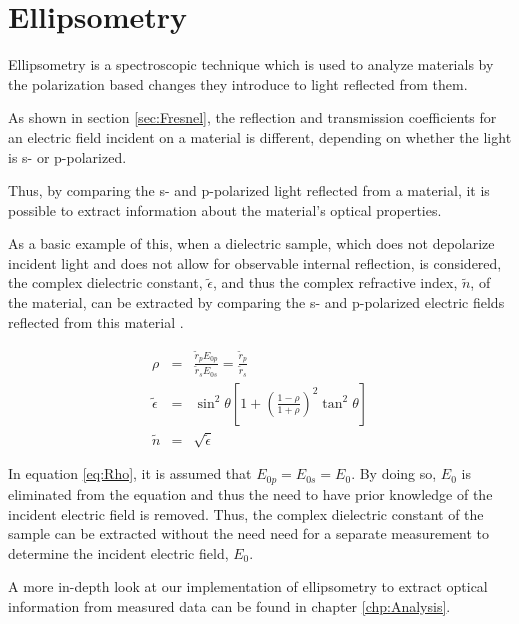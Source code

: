 \section{Ellipsometry}
\label{sec:Ellip}

Ellipsometry is a spectroscopic technique which is used to analyze materials by the polarization based changes they introduce to light reflected from them.

As shown in section \ref{sec:Fresnel}, the reflection and transmission coefficients for an electric field incident on a material is different, depending on whether the light is s- or p-polarized.

Thus, by comparing the s- and p-polarized light reflected from a material, it is possible to extract information about the material's optical properties.

As a basic example of this, when a dielectric sample, which does not depolarize incident light and does not allow for observable internal reflection, is considered, the complex dielectric constant, $\widetilde{\epsilon}$, and thus the complex refractive index, $\widetilde{n}$, of the material, can be extracted by comparing the s- and p-polarized electric fields reflected from this material \cite{Tompkins-2005}.

\begin{eqnarray}
\rho &=& \frac{\widetilde{r}_{p} E_{0 p}}{\widetilde{r}_{s} E_{0 s}} = \frac{\widetilde{r}_{p}}{\widetilde{r}_{s}}\label{eq:Rho}\\
\widetilde{\epsilon} &=& \sin^{2}\theta\left[1 + \left(\frac{1-\rho}{1+\rho}\right)^{2}\tan^{2}\theta\right]\\
\widetilde{n} &=&  \sqrt{\widetilde{\epsilon}}
\label{eq:Ellip}
\end{eqnarray}

In equation \ref{eq:Rho}, it is assumed that $E_{0 p} = E_{0 s} = E_{0}$. By doing so, $E_{0}$ is eliminated from the equation and thus the need to have prior knowledge of the incident electric field is removed.
Thus, the complex dielectric constant of the sample can be extracted without the need need for a separate measurement to determine the incident electric field, $E_{0}$.

A more in-depth look at our implementation of ellipsometry to extract optical information from measured data can be found in chapter \ref{chp:Analysis}.
\endinput